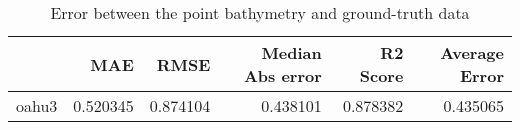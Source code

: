 \begin{table}[h!]
\caption{Error between the point bathymetry and ground-truth data}
\label{tab:oahu3_lidar_error}
\begin{tabular}{lrrrrr}
\toprule
 & MAE & RMSE & Median Abs error & R2 Score & Average Error \\
\midrule
oahu3 & 0.520345 & 0.874104 & 0.438101 & 0.878382 & 0.435065 \\
\bottomrule
\end{tabular}
\end{table}
